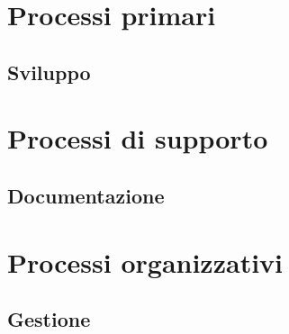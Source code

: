 \documentclass[a4paper,titlepage]{article}
\begin{document}
\newpage
\tableofcontents
\listoffigures
\newpage


\section{Processi primari}
 \subsection{Sviluppo}
  
\section{Processi di supporto} 
 \subsection{Documentazione}  
 
 \subsection{} 
  
\section{Processi organizzativi}
 \subsection{Gestione}
  
\end{document}
